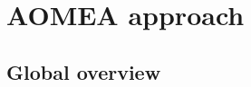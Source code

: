 \documentclass[runningheads]{llncs}
\begin{document}
%



\section{AOMEA approach}







\subsection{Global overview}
\end{document}

